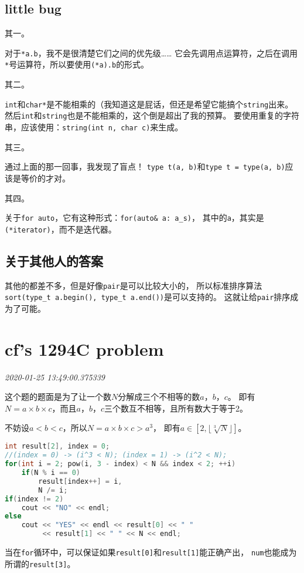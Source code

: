 \documentclass{peterlitsdoc}
\newcommand{\timetx}[1]
    {\par\noindent\emph{\pltgray\small #1}\vspace{2em}}
\newcommand{\vb}{\verb}
\begin{document}
\subsection{little bug}
其一。

对于\vb|*a.b|，我不是很清楚它们之间的优先级\ldots\ldots
它会先调用点运算符，之后在调用\vb|*|号运算符，所以要使用\vb|(*a).b|的形式。

其二。

\vb|int|和\vb|char*|是不能相乘的（我知道这是屁话，但还是希望它能搞个\vb|string|出来。
然后\vb|int|和\vb|string|也是不能相乘的，这个倒是超出了我的预算。
要使用重复的字符串，应该使用：\vb|string(int n, char c)|来生成。

其三。

通过上面的那一回事，我发现了盲点！
\vb|type t(a, b)|和\vb|type t = type(a, b)|应该是等价的才对。

其四。

关于\vb|for auto|，它有这种形式：\vb|for(auto& a: a_s)|，
其中的\vb|a|，其实是\vb|(*iterator)|，而不是迭代器。

\subsection{关于其他人的答案}
其他的都差不多，但是好像\vb|pair|是可以比较大小的，
所以标准排序算法\vb|sort(type_t a.begin(), type_t a.end())|是可以支持的。
这就让给\vb|pair|排序成为了可能。


\section{cf's 1294C problem}\timetx{2020-01-25 13:49:00.375339}

这个题的题面是为了让一个数$N$分解成三个不相等的数$a$，$b$，$c$。
即有$N=a\times b\times c$，而且$a$，$b$，$c$三个数互不相等，且所有数大于等于2。

不妨设$a < b < c$，所以$N=a\times b\times c>a^3$，
即有$a\in[2,\lfloor\sqrt[3]{N}\rfloor]$。

\begin{lstlisting}[language=C++]
int result[2], index = 0;
//(index = 0) -> (i^3 < N); (index = 1) -> (i^2 < N);
for(int i = 2; pow(i, 3 - index) < N && index < 2; ++i)
    if(N % i == 0)
        result[index++] = i,
        N /= i;
if(index != 2)
    cout << "NO" << endl;
else
    cout << "YES" << endl << result[0] << " "
         << result[1] << " " << N << endl;
\end{lstlisting}

当在\vb|for|循环中，可以保证如果\vb|result[0]|和\vb|result[1]|能正确产出，
\vb|num|也能成为所谓的\vb|result[3]|。
\end{document}

